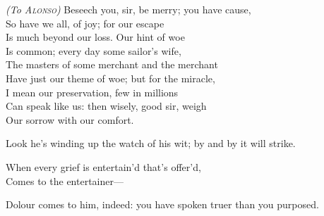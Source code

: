 \begin{placeholder}
	\begin{verse_speech}[Gonzalo] 
	\textit{(To \textsc{Alonso})}
	Beseech you, sir, be merry; you have cause,\\
	So have we all, of joy; for our escape\\
	Is much beyond our loss. Our hint of woe\\
	Is common; every day some sailor's wife,\\
	The masters of some merchant and the merchant\\
	Have just our theme of woe; but for the miracle,\\
	I mean our preservation, few in millions\\
	Can speak like us: then wisely, good sir, weigh\\
	Our sorrow with our comfort.
	\end{verse_speech}
\end{placeholder}

\begin{prose_speech}[Sebastian] Look he's winding up the watch of his wit; by and by it will strike.
\end{prose_speech}

\begin{verse_speech}[Gonzalo] When every grief is entertain'd that's offer'd,\\
Comes to the entertainer—
\end{verse_speech}

\begin{prose_speech}[Gonzalo] Dolour comes to him, indeed: you have spoken truer than you purposed.
\end{prose_speech}

\begin{prose_speech}[Antonio] 
\end{prose_speech}

